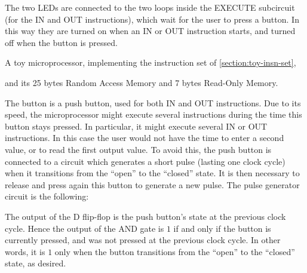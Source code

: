 The two LEDs are connected to the two loops inside the EXECUTE subcircuit (for
the IN and OUT instructions), which wait for the user to press a button. In
this way they are turned on when an IN or OUT instruction starts, and turned
off when the button is pressed.

\newlength{\fullpagefigureheight}
\setlength{\fullpagefigureheight}{\textheight-1.8\baselineskip}
\begin{Figure}[p]
  \begin{leftfullpage}
    \resizebox{!}{\fullpagefigureheight}{}

    \caption{A toy microprocessor, implementing the instruction set of
    \cref{section:toy-insn-set},}\label{fig:T8}
  \end{leftfullpage}
\end{Figure}

\begin{Figure}[p]
  \begin{fullpage}
    \resizebox{!}{\fullpagefigureheight}{}

    \caption*{and its 25 bytes Random Access Memory and 7 bytes Read-Only
    Memory.\hfill~}
  \end{fullpage}
\end{Figure}

The button is a push button, used for both IN and OUT instructions. Due to its
speed, the microprocessor might execute several instructions during the time
this button stays pressed. In particular, it might execute several IN or OUT
instructions. In this case the user would not have the time to enter a second
value, or to read the first output value. To avoid this, the push button is
connected to a circuit which generates a short pulse (lasting one clock cycle)
when it transitions from the ``open'' to the ``closed'' state. It is then
necessary to release and press again this button to generate a new pulse. The
pulse generator circuit is the following:

\begin{center}
  
\end{center}

\noindent The output of the D flip-flop is the push button's state at the
previous clock cycle. Hence the output of the AND gate is $1$ if and only if
the button is currently pressed, and was not pressed at the previous clock
cycle. In other words, it is $1$ only when the button transitions from the
``open'' to the ``closed'' state, as desired.

